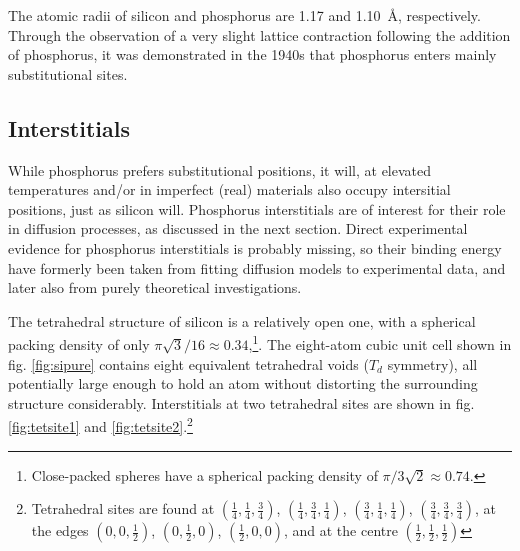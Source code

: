 \documentclass[11pt,bibliography=totoc,index=totoc]{scrbook}   %
\begin{document}

The atomic radii of silicon and phosphorus are 1.17 and 1.10~Å, respectively.
Through the observation of a very slight lattice contraction following the addition of phosphorus,
it was demonstrated in the 1940s that phosphorus enters mainly substitutional sites.\cite{Pearson:1949}




%
\subsection{Interstitials}\label{sec:PInterstitials}
%

While phosphorus prefers substitutional positions, it will, at elevated temperatures and/or in imperfect (real) materials also occupy intersitial positions, just as silicon will.
Phosphorus interstitials are of interest for their role in diffusion processes, as discussed in the next section.
Direct experimental evidence for phosphorus interstitials is probably missing, so their binding energy have formerly been taken from fitting diffusion models to experimental data, and later also from purely theoretical investigations.\cite[391]{Pichler:2004}

The tetrahedral structure of silicon is a relatively open one, with a spherical packing density of only $\pi\sqrt{3}/16\approx 0.34$,\footnote{Close-packed spheres have a spherical packing density of $\pi/3\sqrt{2} \approx 0.74$.}.
The eight-atom cubic unit cell shown in fig. \ref{fig:sipure} contains eight equivalent tetrahedral voids ($T_d$ symmetry), all potentially large enough to hold an atom without distorting the surrounding structure considerably.
Interstitials at two tetrahedral sites are shown in fig. \ref{fig:tetsite1} and \ref{fig:tetsite2}.\footnote{Tetrahedral sites are found at
$(\frac{1}{4},\frac{1}{4},\frac{3}{4})$, 
$(\frac{1}{4},\frac{3}{4},\frac{1}{4})$, 
$(\frac{3}{4},\frac{1}{4},\frac{1}{4})$, 
$(\frac{3}{4},\frac{3}{4},\frac{3}{4})$, 
at the edges
$(0,0,\frac{1}{2})$,
$(0,\frac{1}{2},0)$,
$(\frac{1}{2},0,0)$,
and at the centre
$(\frac{1}{2},\frac{1}{2},\frac{1}{2})$}
\end{document}
